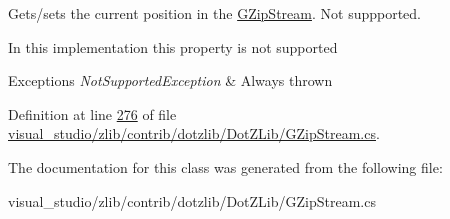 Gets/sets the current position in the {\ttfamily \hyperlink{class_dot_z_lib_1_1_g_zip_stream}{G\+Zip\+Stream}}. Not suppported. 

In this implementation this property is not supported


\begin{DoxyExceptions}{Exceptions}
{\em Not\+Supported\+Exception} & Always thrown\\
\hline
\end{DoxyExceptions}


Definition at line \hyperlink{visual__studio_2zlib_2contrib_2dotzlib_2_dot_z_lib_2_g_zip_stream_8cs_source_l00276}{276} of file \hyperlink{visual__studio_2zlib_2contrib_2dotzlib_2_dot_z_lib_2_g_zip_stream_8cs_source}{visual\+\_\+studio/zlib/contrib/dotzlib/\+Dot\+Z\+Lib/\+G\+Zip\+Stream.\+cs}.



The documentation for this class was generated from the following file\+:\begin{DoxyCompactItemize}
\item 
visual\+\_\+studio/zlib/contrib/dotzlib/\+Dot\+Z\+Lib/\+G\+Zip\+Stream.\+cs\end{DoxyCompactItemize}

